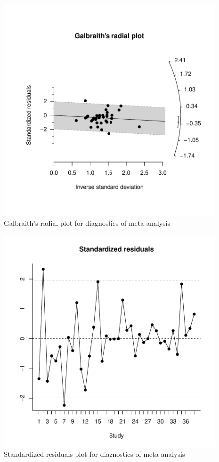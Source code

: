 \documentclass[11pt, a4paper]{article} %
\begin{document}
\begin{figure}
\captionsetup{width=0.6\textwidth}
\centering
\includegraphics{sweave_document_TB-Galbraith}
\caption{Galbraith's radial plot for diagnostics of meta analysis}
\end{figure}

\begin{figure}
\captionsetup{width=0.6\textwidth}
\centering
\includegraphics{sweave_document_TB-stdresplot}
\caption{Standardized residuals plot for diagnostics of meta analysis}
\end{figure}
\end{document}

